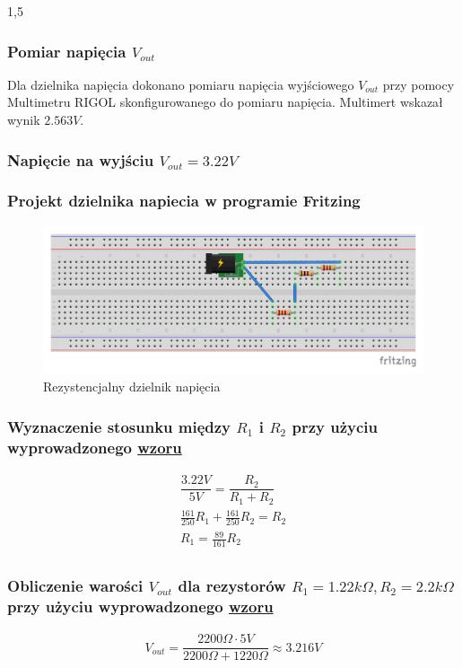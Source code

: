 \documentclass[polish,polish,a4paper]{article}
\begin{document}
\begin{spacing}{1,5}
		\subsubsection*{Pomiar napięcia $ V_{out} $}
		Dla dzielnika napięcia dokonano pomiaru napięcia wyjściowego $ V_{out} $ przy pomocy Multimetru RIGOL skonfigurowanego do pomiaru napięcia. Multimert wskazał wynik $2.563V$.
		
		
		
		\subsubsection{Napięcie na wyjściu $V_{out} =  3.22V $}
		\subsubsection*{Projekt dzielnika napiecia w programie Fritzing}
		
		\begin{figure}[H]
			\centering
			\includegraphics[scale=0.9]{3_22_bb.pdf}
			\caption{Rezystencjalny dzielnik napięcia}
			\label{fig:pod3_22}
		\end{figure}
		
		\subsubsection*{Wyznaczenie stosunku między $ R_{1} $ i $ R_{2} $ przy użyciu wyprowadzonego \hyperref[eq:vout]{wzoru}}
		\begin{gather*}
		\dfrac{3.22V}{5V} = \dfrac{R_{2}}{R_{1} + R_{2}}\\
		\frac{161}{250} R_{1} + \frac{161}{250}R_{2} = R_{2}\\
		R_{1} =\frac{89}{161} R_{2}\\
		\end{gather*}
		\subsubsection*{Obliczenie warości $ V_{out}$ dla rezystorów $ R_{1} = 1.22k\Omega, R_{2} =2.2k\Omega  $  przy użyciu wyprowadzonego \hyperref[eq:vout]{wzoru}}
		\begin{gather*}
		V_{out} = \dfrac{2200\Omega \cdot 5V}{2200\Omega + 1220\Omega} \approx 3.216V\\
		\end{gather*}

\end{spacing}
\end{document}
